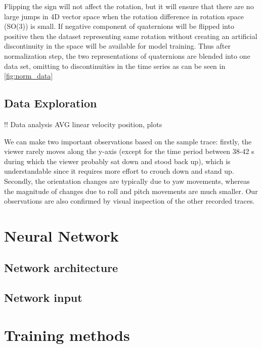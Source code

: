 Flipping the sign will not affect the rotation, but it will ensure that there are no large jumps in 4D vector space when the rotation difference in rotation space (SO(3)) is small. If negative component of quaternions will be flipped into positive then the dataset representing same rotation without creating an artificial discontinuity in the space will be available for model training. Thus after normalization step, the two representations of quaternions are blended into one data set, omitting to discontinuities in the time series as can be seen in \ref{fig:norm_data} 



\subsection{Data Exploration}
\label{sec:design:dataset:explor}
!! Data analysis AVG linear velocity position, plots 

We can make two important observations based on the sample trace: firstly, the viewer rarely moves along the y-axis (except for the time period between 38-42 s during which the viewer probably sat down and stood back up), which is understandable since it requires more effort to crouch down and stand up. Secondly, the orientation changes are typically due to yaw movements, whereas the magnitude of changes due to roll and pitch movements are much smaller. Our observations are also confirmed by visual inspection of the other recorded traces.


\section{Neural Network}
\label{sec:design:nn}

\subsection{Network architecture}
\label{sec:design:nn:architecture}

\subsection{Network input}
\label{sec:design:nn:input}


\section{Training methods}
\label{sec:design:train}
